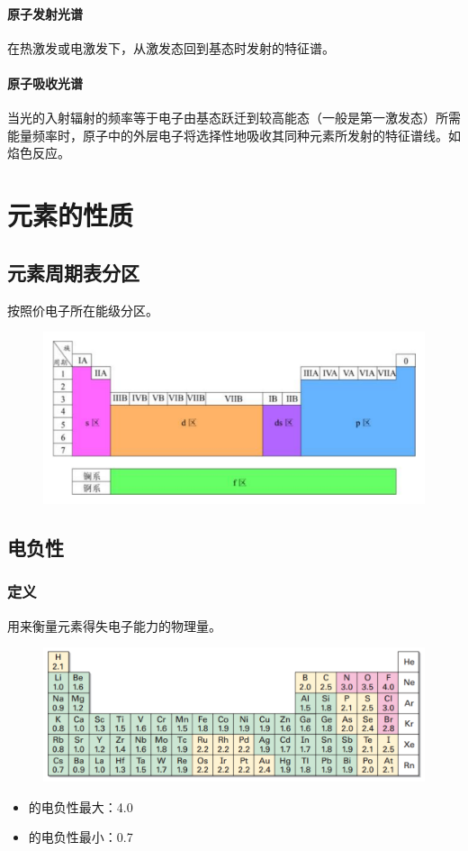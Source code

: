 \documentclass[a4paper]{article}
\begin{document}
	\paragraph{原子发射光谱}
	在热激发或电激发下，从激发态回到基态时发射的特征谱。
	\paragraph{原子吸收光谱}
	当光的入射辐射的频率等于电子由基态跃迁到较高能态（一般是第一激发态）所需能量频率时，原子中的外层电子将选择性地吸收其同种元素所发射的特征谱线。如焰色反应。
	
	
	\clearpage
	\section{元素的性质}
	
	
	\subsection{元素周期表分区}
	按照价电子所在能级分区。
	\begin{figure}[h]
	\centering
	\includegraphics[scale=0.5]{res/Ptable.pdf}
	\end{figure}
	
	
	\subsection{电负性}
	\subsubsection{定义}
	用来衡量元素得失电子能力的物理量。
	\begin{figure}[h]
	\centering
	\includegraphics[scale=0.5]{res/EN.pdf}
	\end{figure}
	\begin{itemize}
		\item {}的电负性最大：4.0
		\item {}的电负性最小：0.7
	\end{itemize}
	
\end{document}
